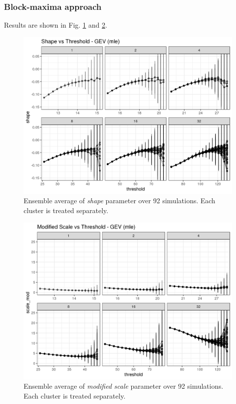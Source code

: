 \documentclass{article}
\begin{document}
\subsubsection{Block-maxima approach}

Results are shown in Fig. \ref{fig:shape_mle} and \ref{fig:modscale_mle}.

\begin{figure}
	\includegraphics[width=\linewidth]{fig/shape_gev_mle_RK401_1e7_maxt05_1e7.png}
	\caption{Ensemble average of \textit{shape} parameter over 92 simulations. Each cluster is treated separately.}
	\label{fig:shape_mle}
\end{figure}

\begin{figure}
	\includegraphics[width=\linewidth]{fig/modscale_gev_mle_RK401_1e7_maxt05_1e7.png}
	\caption{Ensemble average of \textit{modified scale} parameter over 92 simulations. Each cluster is treated separately.}
	\label{fig:modscale_mle}
\end{figure}
\end{document}
